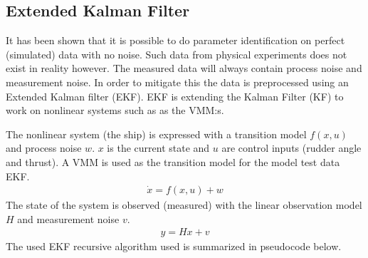 \documentclass[review]{elsarticle}
\begin{document}
\subsection{Extended Kalman Filter}
\label{\detokenize{04.01_EK:extended-kalman-filter}}\label{\detokenize{04.01_EK::doc}}
\sphinxAtStartPar
It has been shown that it is possible to do parameter identification on perfect (simulated) data with no noise. Such data from physical experiments does not exist in reality however. The measured data will always contain process noise and measurement noise. In order to mitigate this the data is preprocessed using an Extended Kalman filter (EKF). EKF is extending the Kalman Filter (KF) to work on nonlinear systems such as as the VMM:s.

\sphinxAtStartPar
The nonlinear system (the ship) is expressed with a transition model \(f(x,u)\) and process noise \(w\). \(x\) is the current state and \(u\) are control inputs (rudder angle and thrust). A VMM is used as the transition model for the model test data EKF.
\begin{equation}\label{equation:04.01_EK:eqnonlinearsystem}
\begin{split}\dot{x} = f(x,u) + w\end{split}
\end{equation}
\sphinxAtStartPar
The state of the system is observed (measured) with the linear observation model \(H\) and measurement noise \(v\).
\begin{equation}\label{equation:04.01_EK:eqobserve}
\begin{split}y = Hx + v\end{split}
\end{equation}
\sphinxAtStartPar
The used EKF recursive algorithm used is summarized in pseudocode below.
\label{04.01_EK:ek-algorithm}
\end{document}
